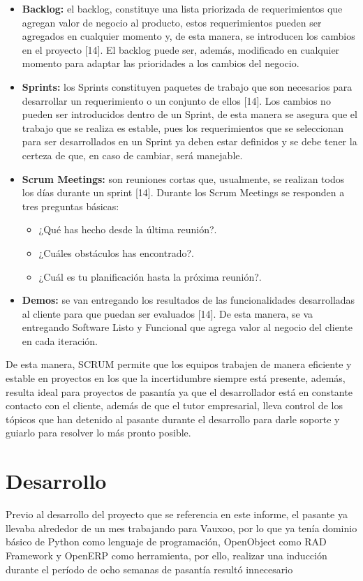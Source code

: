 \documentclass[a4paper, 12pt]{article}
\begin{document}
\begin{itemize}
\item \textbf{Backlog:} el backlog, constituye una lista priorizada de requerimientos que agregan valor de negocio al producto, estos requerimientos pueden ser agregados en cualquier momento y, de esta manera, se introducen los cambios en el proyecto [14]. El backlog puede ser, además, modificado en cualquier momento para adaptar las prioridades a los cambios del negocio.
\item \textbf{Sprints:} los Sprints constituyen paquetes de trabajo que son necesarios para desarrollar un requerimiento o un conjunto de ellos [14]. Los cambios no pueden ser introducidos dentro de un Sprint, de esta manera se asegura que el trabajo que se realiza es estable, pues los requerimientos que se seleccionan para ser desarrollados en un Sprint ya deben estar definidos y se debe tener la certeza de que, en caso de cambiar, será manejable.
\item \textbf{Scrum Meetings:} son reuniones cortas que, usualmente, se realizan todos los días durante un sprint [14]. Durante los Scrum Meetings se responden a tres preguntas básicas:
\begin{itemize}
\item ¿Qué has hecho desde la última reunión?.
\item ¿Cuáles obstáculos has encontrado?.
\item ¿Cuál es tu planificación hasta la próxima reunión?.
\end{itemize}
\item \textbf{Demos:} se van entregando los resultados de las funcionalidades desarrolladas al cliente para que puedan ser evaluados [14]. De esta manera, se va entregando Software Listo y Funcional que agrega valor al negocio del cliente en cada iteración.
\end{itemize}

De esta manera, SCRUM permite que los equipos trabajen de manera eficiente y estable en proyectos en los que la incertidumbre siempre está presente, además, resulta ideal para proyectos de pasantía ya que el desarrollador está en constante contacto con el cliente, además de que el tutor empresarial, lleva control de los tópicos que han detenido al pasante durante el desarrollo para darle soporte y guiarlo para resolver lo más pronto posible.

\section{Desarrollo}
Previo al desarrollo del proyecto que se referencia en este informe, el pasante ya llevaba alrededor de un mes trabajando para Vauxoo, por lo que ya tenía dominio básico de Python como lenguaje de programación, OpenObject como RAD Framework y OpenERP como herramienta, por ello, realizar una inducción durante el período de ocho semanas de pasantía resultó innecesario
\end{document}

